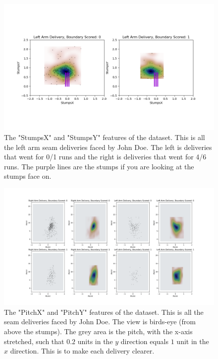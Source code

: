 \documentclass[12pt,a4paper]{report}
\theoremstyle{definition}
\begin{document}
\begin{figure}
    \centering
    \includegraphics[width=\linewidth]{post_wicket_left_arm.png}
    \caption{The "StumpsX" and "StumpsY" features of the dataset. This is all the left arm seam deliveries faced by John Doe. The left is deliveries that went for 0/1 runs and the right is deliveries that went for 4/6 runs. The purple lines are the stumps if you are looking at the stumps face on.}
    \label{fig:StumpsXYLeft}
\end{figure}

\begin{figure}
    \centering
    \includegraphics[width=\linewidth]{pitch_bounce.png}
    \caption{The "PitchX" and "PitchY" features of the dataset. This is all the seam deliveries faced by John Doe. The view is birds-eye (from above the stumps). The grey area is the pitch, with the x-axis stretched, such that $0.2$ units in the $y$ direction equals $1$ unit in the $x$ direction. This is to make each delivery clearer.}
    \label{fig:PitchXY}
\end{figure}
\end{document}
